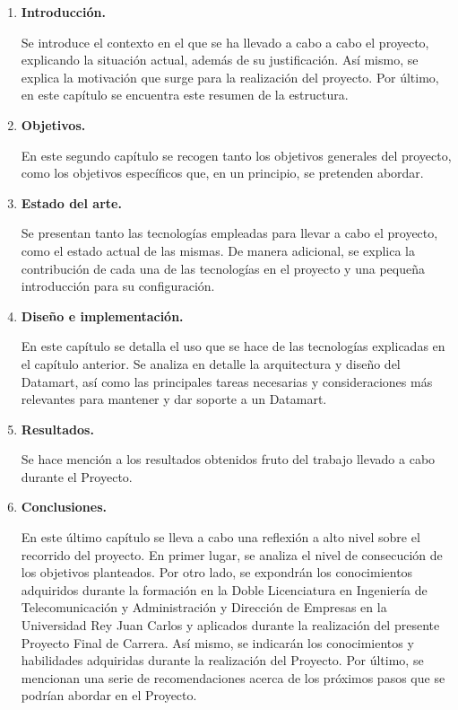 \documentclass[a4paper, 12pt]{book}
\begin{document}
\begin{enumerate}
	\item \textbf{Introducción.}\par
	Se introduce el contexto en el que se ha llevado a cabo a cabo el proyecto, explicando la situación actual, además de su justificación. Así mismo, se explica la motivación que surge para la realización del proyecto. Por último, en este capítulo se encuentra este resumen de la estructura. 
	
	\item \textbf{Objetivos.}\par
	En este segundo capítulo se recogen tanto los objetivos generales del proyecto, como los objetivos específicos que, en un principio, se pretenden abordar.
	
	\item \textbf{Estado del arte.}\par
	Se presentan tanto las tecnologías empleadas para llevar a cabo el proyecto, como el estado actual de las mismas. De manera adicional, se explica la contribución de cada una de las tecnologías en el proyecto y una pequeña introducción para su configuración.
		
	\item \textbf{Diseño e implementación.}\par
	En este capítulo se detalla el uso que se hace de las tecnologías explicadas en el capítulo anterior. Se analiza en detalle la arquitectura y diseño del Datamart, así como las principales tareas necesarias y consideraciones más relevantes para mantener y dar soporte a un Datamart.
	
	\item \textbf{Resultados.}\par
	Se hace mención a los resultados obtenidos fruto del trabajo llevado a cabo durante el Proyecto.
	
	\item \textbf{Conclusiones.}\par
	En este último capítulo se lleva a cabo una reflexión a alto nivel sobre el recorrido del proyecto. En primer lugar, se analiza el nivel de consecución de los objetivos planteados. Por otro lado, se expondrán los conocimientos adquiridos durante la formación en la Doble Licenciatura en Ingeniería de Telecomunicación y Administración y Dirección de Empresas en la Universidad Rey Juan Carlos y aplicados durante la realización del presente Proyecto Final de Carrera. Así mismo, se indicarán los conocimientos y habilidades adquiridas durante la realización del Proyecto. Por último, se mencionan una serie de recomendaciones acerca de los próximos pasos que se podrían abordar en el Proyecto.
	
\end{enumerate}
\end{document}
